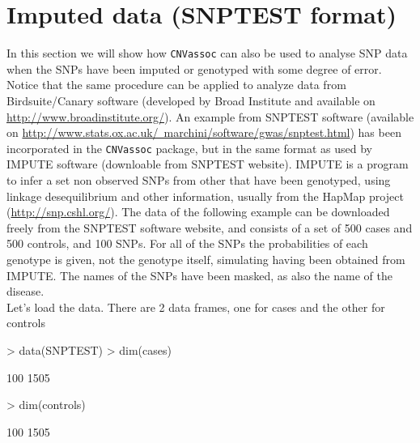 \documentclass[11pt]{article}
\begin{document}
\clearpage



\section{Imputed data (SNPTEST format)}


In this section we will show how \texttt{CNVassoc} can also be used to analyse SNP data when the SNPs have been imputed or
genotyped with some degree of error. Notice that the same procedure can be applied to analyze data from Birdsuite/Canary software
(developed by Broad Institute and available on \href{http://www.broadinstitute.org/}{http://www.broadinstitute.org/}).
An example from SNPTEST software (available on \href{http://www.stats.ox.ac.uk/~marchini/software/gwas/snptest.html}
{http://www.stats.ox.ac.uk/~marchini/software/gwas/snptest.html}) has been incorporated in the \texttt{CNVassoc} package, but
in the same format as used by IMPUTE software (downloable from SNPTEST website). IMPUTE is a program to infer a set non 
observed SNPs from other that have been genotyped, using linkage desequilibrium and other information, usually from the HapMap project
(\href{http://snp.cshl.org/}{http://snp.cshl.org/}).
The data of the following example can be downloaded freely from the SNPTEST software website, and consists of a set
of 500 cases and 500 controls, and 100 SNPs. For all of the SNPs the probabilities of each genotype is given, not the genotype itself,
simulating having been obtained from IMPUTE.  The names of the SNPs have been masked, as also the name of the disease. \\

Let's load the data. There are 2 data frames, one for cases and the other for controls
\begin{Schunk}
\begin{Sinput}
> data(SNPTEST)
> dim(cases)
\end{Sinput}
\begin{Soutput}
[1]  100 1505
\end{Soutput}
\begin{Sinput}
> dim(controls)
\end{Sinput}
\begin{Soutput}
[1]  100 1505
\end{Soutput}
\end{Schunk}
\end{document}
